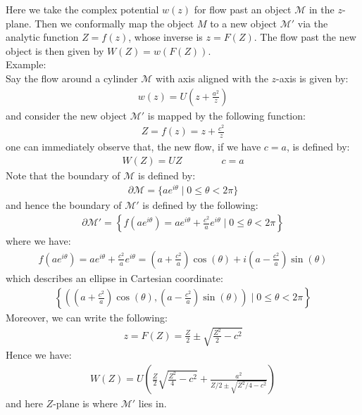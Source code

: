 \documentclass[11pt]{book}
\theoremstyle{break}
\theoremstyle{break}
\newcommand{\M}{\mathcal{M}}
\newcommand{\example}{\color{green}Example: \color{black}}
\begin{document}
Here we take the complex potential $w(z)$ for flow past an object $\M$ in the $z$-plane. Then we conformally map the object $M$ to a new object $\M'$ via the analytic function $Z = f(z)$, whose inverse is $z = F(Z)$. The flow past the new object is then given by $W(Z) = w(F(Z))$. \\

\example\\ 
Say the flow around a cylinder $\M$ with axis aligned with the $z$-axis is given by:
\begin{align*}
w(z) = U \left( z + \frac{a^2}{z}\right)
\end{align*}
and consider the new object $\M'$ is mapped by the following function:
\begin{align}
Z = f(z) = z+ \frac{c^2}{z} \tag{Joukowski map}
\end{align}
one can immediately observe that, the new flow, if we have $c= a$, is defined by:
\begin{align*}
W(Z) = UZ \qquad\qquad c=a
\end{align*}
Note that the boundary of $\M$ is defined by:
\begin{align*}
\partial \M = \{ae^{i\theta}\mid 0\leq \theta < 2\pi\}
\end{align*}
and hence the boundary of $\M'$ is defined by the following:
\begin{align*}
\partial \M' = \left\{f(ae^{i\theta}) = ae^{i\theta}+\frac{c^2}{a}e^{i\theta} \mid 0\leq \theta < 2\pi\right\}
\end{align*}
where we have:
\begin{align*}
f(ae^{i\theta}) = ae^{i\theta}+\frac{c^2}{a}e^{i\theta} = \left( a+ \frac{c^2}{a}\right) \cos(\theta) + i \left( a - \frac{c^2}{a}\right) \sin(\theta)
\end{align*}
which describes an ellipse in Cartesian coordinate: 
\begin{align*}
\left\{\left(\left( a+ \frac{c^2}{a}\right) \cos(\theta)  , \left( a - \frac{c^2}{a}\right) \sin(\theta)\right)\mid 0\leq \theta < 2\pi\right\}
\end{align*}
Moreover, we can write the following:
\begin{align*}
z = F(Z) = \frac{Z}{2}\pm \sqrt{\frac{Z^2}{2} - c^2}
\end{align*}
Hence we have:
\begin{align*}
W(Z) = U \left( \frac{Z}{2}\sqrt{\frac{Z^2}{4} - c^2} + \frac{a^2}{Z/2 \pm \sqrt{Z^2/4-c^2}}\right)
\end{align*}
and here $Z$-plane is where $\M'$ lies in. 
\end{document}
